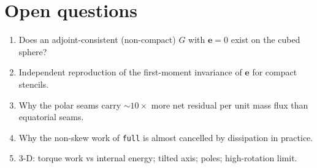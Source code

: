 \section{Open questions}\label{sec:open}
\begin{enumerate}
\item Does an adjoint-consistent (non-compact) $G$ with $\bm e=0$ exist on the cubed sphere?
\item Independent reproduction of the first-moment invariance of $\bm e$ for compact stencils.
\item Why the polar seams carry $\sim10\times$ more net residual per unit mass flux than equatorial seams.
\item Why the non-skew work of \texttt{full} is almost cancelled by dissipation in practice.
\item 3-D: torque work vs internal energy; tilted axis; poles; high-rotation limit.
\end{enumerate}
